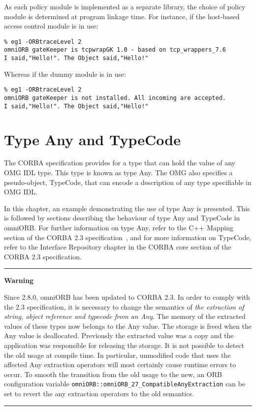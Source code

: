 \documentclass[11pt,twoside,a4paper]{book}
\newcommand{\code}[1]{\texttt{#1}}
\newenvironment{statement}%
 {\noindent\begin{minipage}{\textwidth}%
  \vspace{.5\baselineskip}%
  \noindent\rule{\textwidth}{2pt}%
  \vspace{.25\baselineskip}%
  \begin{list}{}{\setlength{\listparindent}{0em}%
                 \setlength{\itemindent}{0em}%
                 \setlength{\leftmargin}{1.5em}%
                 \setlength{\rightmargin}{\leftmargin}%
                 \setlength{\topsep}{0pt}%
                 \setlength{\partopsep}{0pt}}
  \item\relax}
 {\end{list}%
  \vspace{-.25\baselineskip}%
  \noindent\rule{\textwidth}{2pt}%
  \vspace{.5\baselineskip}%
  \end{minipage}}
\begin{document}
As each policy module is implemented as a separate library, the choice
of policy module is determined at program linkage time. For instance,
if the host-based access control module is in use:

{\small
\begin{verbatim}
% eg1 -ORBtraceLevel 2
omniORB gateKeeper is tcpwrapGK 1.0 - based on tcp_wrappers_7.6 
I said,"Hello!". The Object said,"Hello!"
\end{verbatim}
}

\noindent Whereas if the dummy module is in use:

{\small
\begin{verbatim}
% eg1 -ORBtraceLevel 2
omniORB gateKeeper is not installed. All incoming are accepted.
I said,"Hello!". The Object said,"Hello!"
\end{verbatim}
}





\chapter{Type Any and TypeCode}
\label{ch_any}

The CORBA specification provides for a type that can hold the value of
any OMG IDL type. This type is known as type Any. The OMG also
specifies a pseudo-object, TypeCode, that can encode a description of
any type specifiable in OMG IDL.

In this chapter, an example demonstrating the use of type Any is
presented.  This is followed by sections describing the behaviour of
type Any and TypeCode in omniORB.  For further information on type
Any, refer to the C++ Mapping section of the CORBA 2.3
specification~\cite{corba23-spec}, and for more information on
TypeCode, refer to the Interface Repository chapter in the CORBA core
section of the CORBA 2.3 specification.


\begin{statement}
\centerline{\textbf{Warning}}

Since 2.8.0, omniORB has been updated to CORBA 2.3. In order to comply
with the 2.3 specification, it is necessary to change the semantics of
\emph{the extraction of string, object reference and typecode from an
Any}. The memory of the extracted values of these types now belongs to
the Any value. The storage is freed when the Any value is deallocated.
Previously the extracted value was a copy and the application was
responsible for releasing the storage. It is not possible to detect
the old usage at compile time. In particular, unmodified code that
uses the affected Any extraction operators will most certainly cause
runtime errors to occur.  To smooth the transition from the old usage
to the new, an ORB configuration variable
\code{omniORB::omniORB\_27\_CompatibleAnyExtraction} can be set to
revert the any extraction operators to the old semantics.

\end{statement}
\end{document}
